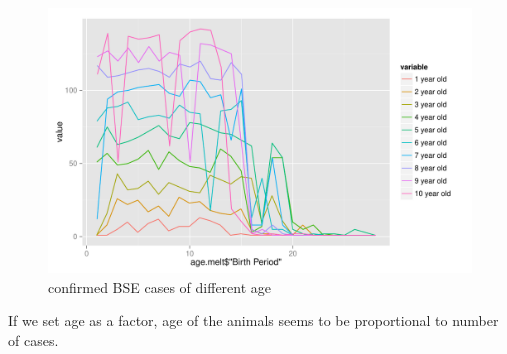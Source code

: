\documentclass{article}\usepackage[]{graphicx}\usepackage[]{color}
\newenvironment{knitrout}{}{} %
\begin{document}
\begin{knitrout}
\begin{figure}[H]
\includegraphics[width=\textwidth]{figure/age} \caption[confirmed BSE cases of different age]{confirmed BSE cases of different age\label{fig:age}}
\end{figure}


\end{knitrout}


If we set age as a factor, age of the animals seems to be proportional to number of cases. 
\end{document}
